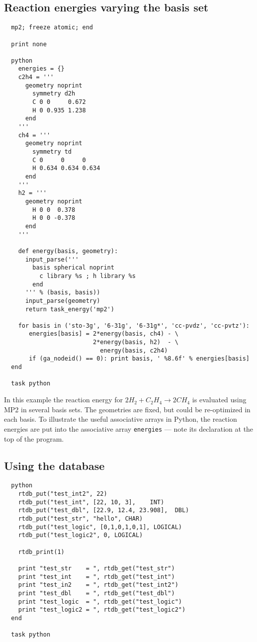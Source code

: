 \subsection{Reaction energies varying the basis set}

\begin{verbatim}
  mp2; freeze atomic; end

  print none

  python
    energies = {}
    c2h4 = '''
      geometry noprint
        symmetry d2h
        C 0 0     0.672
        H 0 0.935 1.238
      end
    '''
    ch4 = '''
      geometry noprint
        symmetry td 
        C 0     0     0
        H 0.634 0.634 0.634
      end
    '''
    h2 = '''
      geometry noprint
        H 0 0  0.378
        H 0 0 -0.378
      end
    '''

    def energy(basis, geometry):
      input_parse('''
        basis spherical noprint
          c library %s ; h library %s 
        end
      ''' % (basis, basis))
      input_parse(geometry)
      return task_energy('mp2')

    for basis in ('sto-3g', '6-31g', '6-31g*', 'cc-pvdz', 'cc-pvtz'):
       energies[basis] = 2*energy(basis, ch4) - \
                         2*energy(basis, h2)  - \
                           energy(basis, c2h4)
       if (ga_nodeid() == 0): print basis, ' %8.6f' % energies[basis]
  end 

  task python
\end{verbatim}

In this example the reaction energy for 
$2H_2 + C_2H_4 \rightarrow 2CH_4$ is evaluated using MP2 in several
basis sets.  The geometries are fixed, but could be re-optimized in
each basis.  To illustrate the useful associative arrays in Python,
the reaction energies are put into the associative array
\verb+energies+ --- note its declaration at the top of the program.

\subsection{Using the database}

\begin{verbatim}
  python
    rtdb_put("test_int2", 22)
    rtdb_put("test_int", [22, 10, 3],    INT)
    rtdb_put("test_dbl", [22.9, 12.4, 23.908],  DBL)
    rtdb_put("test_str", "hello", CHAR)
    rtdb_put("test_logic", [0,1,0,1,0,1], LOGICAL)
    rtdb_put("test_logic2", 0, LOGICAL)

    rtdb_print(1)

    print "test_str    = ", rtdb_get("test_str")
    print "test_int    = ", rtdb_get("test_int")
    print "test_in2    = ", rtdb_get("test_int2")
    print "test_dbl    = ", rtdb_get("test_dbl")
    print "test_logic  = ", rtdb_get("test_logic")
    print "test_logic2 = ", rtdb_get("test_logic2")
  end

  task python
\end{verbatim}


